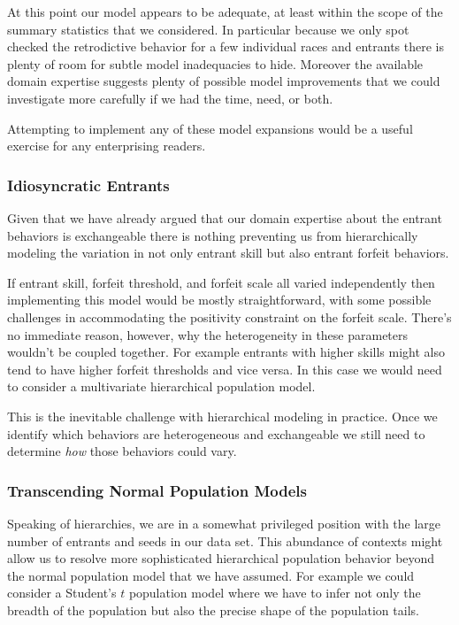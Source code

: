 \documentclass[
  letterpaper,
  DIV=11,
  numbers=noendperiod]{scrartcl}
\begin{document}
At this point our model appears to be adequate, at least within the
scope of the summary statistics that we considered. In particular
because we only spot checked the retrodictive behavior for a few
individual races and entrants there is plenty of room for subtle model
inadequacies to hide. Moreover the available domain expertise suggests
plenty of possible model improvements that we could investigate more
carefully if we had the time, need, or both.

Attempting to implement any of these model expansions would be a useful
exercise for any enterprising readers.

\subsubsection{Idiosyncratic Entrants}\label{idiosyncratic-entrants}

Given that we have already argued that our domain expertise about the
entrant behaviors is exchangeable there is nothing preventing us from
hierarchically modeling the variation in not only entrant skill but also
entrant forfeit behaviors.

If entrant skill, forfeit threshold, and forfeit scale all varied
independently then implementing this model would be mostly
straightforward, with some possible challenges in accommodating the
positivity constraint on the forfeit scale. There's no immediate reason,
however, why the heterogeneity in these parameters wouldn't be coupled
together. For example entrants with higher skills might also tend to
have higher forfeit thresholds and vice versa. In this case we would
need to consider a multivariate hierarchical population model.

This is the inevitable challenge with hierarchical modeling in practice.
Once we identify which behaviors are heterogeneous and exchangeable we
still need to determine \emph{how} those behaviors could vary.

\subsubsection{Transcending Normal Population
Models}\label{transcending-normal-population-models}

Speaking of hierarchies, we are in a somewhat privileged position with
the large number of entrants and seeds in our data set. This abundance
of contexts might allow us to resolve more sophisticated hierarchical
population behavior beyond the normal population model that we have
assumed. For example we could consider a Student's \(t\) population
model where we have to infer not only the breadth of the population but
also the precise shape of the population tails.
\end{document}

